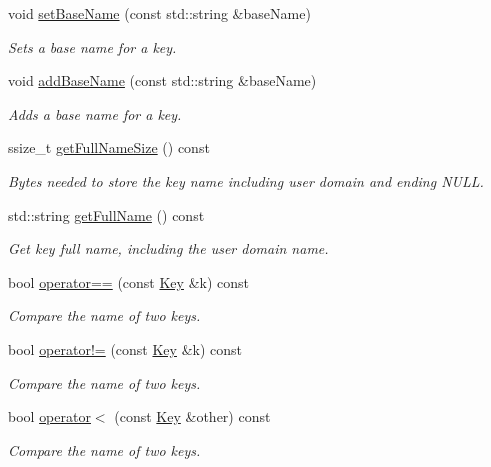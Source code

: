 \begin{DoxyCompactItemize}
void \hyperlink{classkdb_1_1Key_a0c8c7cef03d6482d89973be72fb3c8b8}{set\-Base\-Name} (const std\-::string \&base\-Name)
\begin{DoxyCompactList}\small\item\em Sets a base name for a key. \end{DoxyCompactList}\item 
void \hyperlink{classkdb_1_1Key_ad2f72ce0985413ce588dc33a575ea306}{add\-Base\-Name} (const std\-::string \&base\-Name)
\begin{DoxyCompactList}\small\item\em Adds a base name for a key. \end{DoxyCompactList}\item 
ssize\-\_\-t \hyperlink{classkdb_1_1Key_a4b5c13b86402dffa0845a6044cd57b39}{get\-Full\-Name\-Size} () const 
\begin{DoxyCompactList}\small\item\em Bytes needed to store the key name including user domain and ending N\-U\-L\-L.  \end{DoxyCompactList}\item 
std\-::string \hyperlink{classkdb_1_1Key_ab94686ea0b459e5a383942ec322d9c6e}{get\-Full\-Name} () const 
\begin{DoxyCompactList}\small\item\em Get key full name, including the user domain name.  \end{DoxyCompactList}\item 
bool \hyperlink{classkdb_1_1Key_abaff8356eb91a6d3aed2b6d282269da2}{operator==} (const \hyperlink{classkdb_1_1Key}{Key} \&k) const 
\begin{DoxyCompactList}\small\item\em Compare the name of two keys.  \end{DoxyCompactList}\item 
bool \hyperlink{classkdb_1_1Key_a313a84b686a72769ecf4c368a79d492c}{operator!=} (const \hyperlink{classkdb_1_1Key}{Key} \&k) const 
\begin{DoxyCompactList}\small\item\em Compare the name of two keys.  \end{DoxyCompactList}\item 
bool \hyperlink{classkdb_1_1Key_aace409efd393ae21f08d333f45da2769}{operator$<$} (const \hyperlink{classkdb_1_1Key}{Key} \&other) const 
\begin{DoxyCompactList}\small\item\em Compare the name of two keys.  \end{DoxyCompactList}\item 

\end{DoxyCompactItemize}
